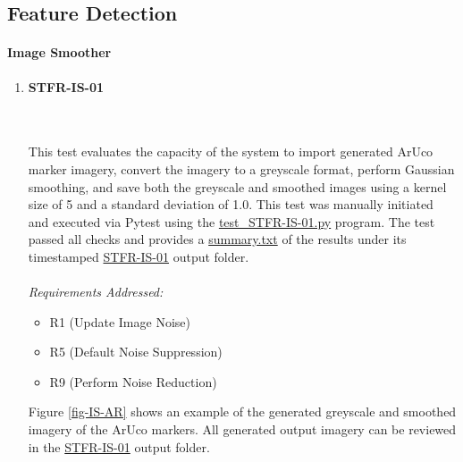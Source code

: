 \documentclass[12pt, titlepage]{article}
\begin{document}
\subsection{Feature Detection}
\paragraph{Image Smoother}

\begin{enumerate}
\item \hypertarget{STFR-IS-01}{\textbf{STFR-IS-01}} \\ \\ 
This test evaluates the capacity of the system to import generated ArUco marker imagery, convert the imagery to a greyscale format, perform Gaussian smoothing, and save both the greyscale and smoothed images using a kernel size of 5 and a standard deviation of 1.0. This test was manually initiated and executed via Pytest using the \href{https://github.com/KiranSingh15/CAS-741-Image-Correspondences/blob/main/src/tests/test_STFR-IS-01.py}{test\_STFR-IS-01.py} program. The test passed all checks and provides a \href{https://github.com/KiranSingh15/CAS-741-Image-Correspondences/blob/main/src/tests/Outputs/2025-04-13_12-19-08/summary.txt}{summary.txt} of the results under its timestamped \href{https://github.com/KiranSingh15/CAS-741-Image-Correspondences/tree/main/src/tests/Outputs/2025-04-13_12-19-08}{STFR-IS-01} output folder. \\ \\
\textit{Requirements Addressed:}
\begin{itemize}
\item R1 (Update Image Noise) 
\item R5 (Default Noise Suppression)
\item R9 (Perform Noise Reduction)
\end{itemize}

Figure \ref{fig-IS-AR} shows an example of the generated greyscale and smoothed imagery of the ArUco markers. All generated output imagery can be reviewed in the \href{https://github.com/KiranSingh15/CAS-741-Image-Correspondences/tree/main/src/tests/Outputs/2025-04-13_12-19-08}{STFR-IS-01} output folder.\\



\end{enumerate}
\end{document}
